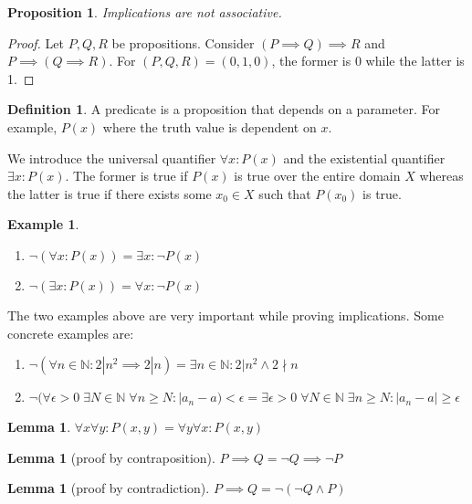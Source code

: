 \documentclass{article}
\newcommand\N{\ensuremath{\mathbb{N}}}
\newtheorem{lemma}[theorem]{Lemma}
\theoremstyle{definition}
\newtheorem{definition}{Definition}[subsection]
\newtheorem{eg}{Example}[subsection]
\theoremstyle{remark}
\theoremstyle{plain}
\newtheorem{prop}{Proposition}[subsection]
\begin{document}
\begin{prop}
Implications are not associative. 
\end{prop}
\begin{proof}
Let $P, Q, R$ be propositions. Consider $(P \implies Q) \implies R$ and $P \implies (Q \implies R)$. For $(P, Q, R) = (0, 1, 0)$, the former is 0 while the latter is 1. 
\end{proof}

\begin{definition}
A predicate is a proposition that depends on a parameter. For example, $P(x)$ where the truth value is dependent on $x$.
\end{definition}

We introduce the universal quantifier $\forall x : P(x)$ and the existential quantifier $\exists x : P(x)$. The former is true if $P(x)$ is true over the entire domain $X$ whereas the latter is true if there exists some $x_0 \in X$ such that $P(x_0)$ is true. 

\begin{eg}
    \begin{enumerate}
        \item $\lnot (\forall x : P(x)) = \exists x : \lnot P(x)$
        \item $\lnot (\exists x : P(x)) = \forall x : \lnot P(x)$
    \end{enumerate}
\end{eg}

The two examples above are very important while proving implications. Some concrete examples are:
\begin{enumerate}
    \item $\lnot (\forall n \in \N : 2|n^2 \implies 2|n) = \exists n \in \N : 2|n^2 \land 2 \nmid n$
    \item $\lnot (\forall \epsilon > 0 \; \exists N \in \N \; \forall n \geq N : |a_n - a) < \epsilon = \exists \epsilon > 0 \; \forall N \in \N \; \exists n \geq N : |a_n - a| \geq \epsilon$
\end{enumerate}

\begin{lemma}
$\forall x \forall y: P(x,y) = \forall y \forall x : P(x,y)$
\end{lemma}

\begin{lemma}[proof by contraposition]
    $P \implies Q = \lnot Q \implies \lnot P$
\end{lemma}

\begin{lemma}[proof by contradiction]
    $P \implies Q = \lnot (\lnot Q \land P)$
\end{lemma}
\end{document}
